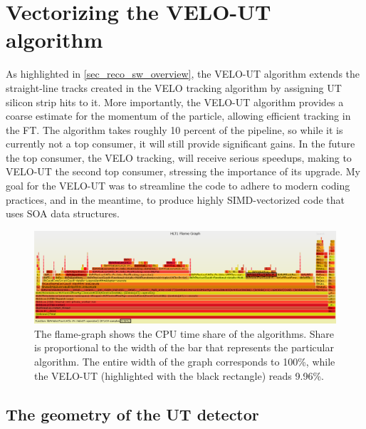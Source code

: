 \documentclass[12pt]{article}
\begin{document}
\newpage
\section{Vectorizing the VELO-UT algorithm}\label{sec_opt_velout}

As highlighted in \ref{sec_reco_sw_overview}, the VELO-UT algorithm extends the straight-line tracks created in the VELO tracking algorithm by assigning UT silicon strip hits to it. More importantly, the VELO-UT algorithm provides a coarse estimate for the momentum of the particle, allowing efficient tracking in the FT.
The algorithm takes roughly 10 percent of the pipeline, so while it is currently not a top consumer, it will still provide significant gains. In the future the top consumer, the VELO tracking, will receive serious speedups, making to VELO-UT the second top consumer, stressing the importance of its upgrade. My goal for the VELO-UT was to streamline the code to adhere to modern coding practices, and in the meantime, to produce highly SIMD-vectorized code that uses SOA data structures.


\begin{figure}[H]
	\begin{center}
		\includegraphics[width=\textwidth]{velout_flamegraph}
	\end{center}
	\caption[CPU time share of the VELO-UT algorithm]{The flame-graph shows the CPU time share of the algorithms. Share is proportional to the width of the bar that represents the particular algorithm. The entire width of the graph corresponds to 100\%, while the VELO-UT (highlighted with the black rectangle) reads 9.96\%.}
	\label{fig_velout_flamegraph}
\end{figure}


\subsection{The geometry of the UT detector}
\end{document}
